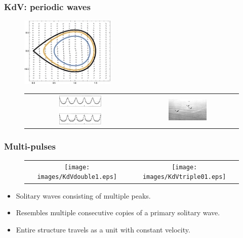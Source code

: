 \documentclass[16pt]{beamer}
\begin{document}
\begin{frame}
\frametitle{KdV: periodic waves}
\fontsize{16}{7.2}\selectfont

\begin{figure}[H]
\begin{center}
\includegraphics[width=0.4\textwidth]{images/KdV3phaseportrait.eps}
\end{center}
\end{figure}

\begin{figure}[H]
\begin{center}
\begin{tabular}{cc}
\includegraphics[width=0.4\textwidth]{images/cnoidal3.png} & \includegraphics[width=0.4\textwidth]{images/cnoidal.jpg}
\end{tabular}
\end{center}
\end{figure}
\end{frame}

\begin{frame}
\frametitle{Multi-pulses}
\fontsize{16}{7.2}\selectfont
\begin{figure}[H]
\begin{center}
\begin{tabular}{cc}
\texttt{[image: images/KdVdouble1.eps]} & \texttt{[image: images/KdVtriple01.eps]}
\end{tabular}
\end{center}
\end{figure}
\begin{itemize}
\item Solitary waves consisting of multiple peaks.
\vspace{0.25ex}
\item Resembles multiple consecutive copies of a primary solitary wave.
\vspace{0.25ex}
\item Entire structure travels as a unit with constant velocity.
\end{itemize}
\end{frame}
\end{document}
